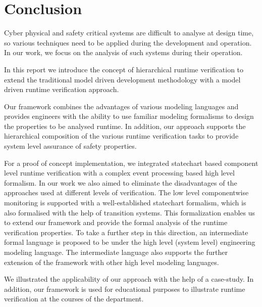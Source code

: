 \chapter{Conclusion}
\label{chap:conclusion}

Cyber physical and safety critical systems are difficult to analyse at design time, so various techniques need to be applied during the development and operation. In our work, we focus on the analysis of such systems during their operation.

In this report we introduce the concept of hierarchical runtime verification to extend the traditional model driven development methodology with a model driven runtime verification approach.

Our framework combines the advantages of various modeling languages and provides engineers with the ability to use familiar modeling formalisms to design the properties to be analysed runtime. In addition, our approach supports the hierarchical composition of the various runtime verification tasks to provide system level assurance of safety properties. 

For a proof of concept implementation, we integrated statechart based component level runtime verification with a complex event processing based high level formalism. In our work we also aimed to eliminate the disadvantages of the approaches used at different levels of verification. The low level componentwise monitoring is supported with a well-established statechart formalism, which is also formalised with the help of transition systems. This formalization enables us to extend our framework and provide the formal analysis of the runtime verification properties. To take a further step in this direction, an intermediate formal language is proposed to be under the high level (system level) engineering modeling language. The intermediate language also supports the further extension of the framework with other high level modeling languages. 

We illustrated the applicability of our approach with the help of a case-study. In addition, our framework is used for educational purposes to illustrate runtime verification at the courses of the department.
